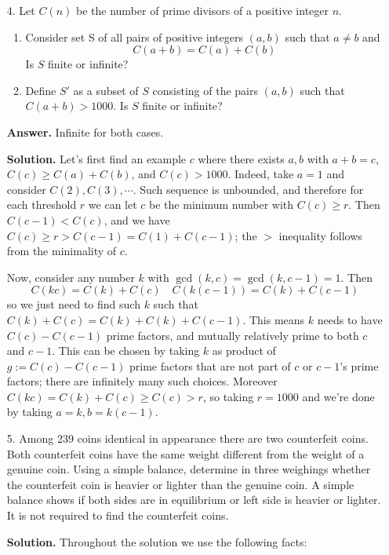 \documentclass[11pt,a4paper]{article}
\begin{document}
\begin{enumerate}
    \item[4.] 
    Let $C(n)$ be the number of prime divisors of a positive integer $n$.
    \begin{enumerate}
    	\item Consider set S of all pairs of positive integers $(a, b)$ such that $a\neq b$ and
    	\[
    	C(a + b) = C(a) + C(b)
    	\]
    	Is $S$ finite or infinite?
    	\item Define $S'$ as a subset of $S$ consisting of the pairs $(a, b)$ such that $C(a+b) > 1000$. 
    	Is $S$ finite or infinite?
    	
    \end{enumerate}

    \textbf{Answer.} Infinite for both cases. 
    
    \textbf{Solution.} 
    Let's first find an example $c$ where there exists $a, b$ with $a+b=c$, $C(c)\ge C(a)+C(b)$, and $C(c)>1000$. 
    Indeed, take $a=1$ and consider $C(2), C(3), \cdots$. 
    Such sequence is unbounded, and therefore for each threshold $r$ we can let $c$ be the minimum number with $C(c)\ge r$. 
    Then $C(c-1)<C(c)$, and we have $C(c)\ge r > C(c-1)=C(1)+C(c-1)$; 
    the $>$ inequality follows from the minimality of $c$. 
    
    Now, 
    consider any number $k$ with $\gcd(k, c)=\gcd(k, c-1)=1$. 
    Then 
    \[
    C(kc)=C(k)+C(c)\quad 
    C(k(c-1))=C(k)+C(c-1)
    \]
    so we just need to find such $k$ such that $C(k)+C(c)=C(k)+C(k)+C(c-1)$. 
    This means $k$ needs to have $C(c)-C(c-1)$ prime factors, and mutually relatively prime to both $c$ and $c-1$. 
    This can be chosen by taking $k$ as product of $g:=C(c)-C(c-1)$ prime factors that are not part of $c$ or $c-1$'s prime factors; 
    there are infinitely many such choices. 
    Moreover $C(kc)=C(k)+C(c)\ge C(c)>r$, so taking $r=1000$ and we're done by taking $a=k, b=k(c-1)$. 
    
    \item[5.] 
    Among 239 coins identical in appearance there are two counterfeit coins. Both counterfeit
    coins have the same weight different from the weight of a genuine coin.
    Using a simple balance, determine in three weighings whether the counterfeit coin is heavier
    or lighter than the genuine coin. A simple balance shows if both sides are in equilibrium or
    left side is heavier or lighter. It is not required to find the counterfeit coins. 
    
    \textbf{Solution.} 
    Throughout the solution we use the following facts: 
    

\end{enumerate}
\end{document}
